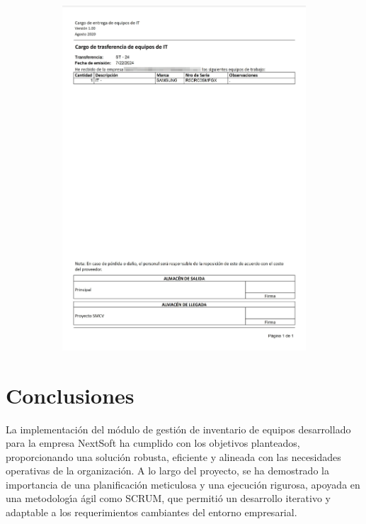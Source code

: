 \documentclass[stu, 12pt, letterpaper, donotrepeattitle, floatsintext, natbib]{apa7}
\begin{document}
\begin{figure}[h]
\begin{subfigure}[b]{0.3\textwidth}
        \includegraphics[width=\textwidth]{./images/reporteTransferencia.png}
    \end{subfigure}
\end{figure}

\newpage
\section{Conclusiones}
La implementaci\'on del m\'odulo de gesti\'on de inventario de equipos desarrollado para la empresa NextSoft ha cumplido con los objetivos planteados, proporcionando una soluci\'on robusta, eficiente y alineada con las necesidades operativas de la organizaci\'on. A lo largo del proyecto, se ha demostrado la importancia de una planificaci\'on meticulosa y una ejecuci\'on rigurosa, apoyada en una metodolog\'{\i}a \'agil como SCRUM, que permiti\'o un desarrollo iterativo y adaptable a los requerimientos cambiantes del entorno empresarial.
\end{document}

